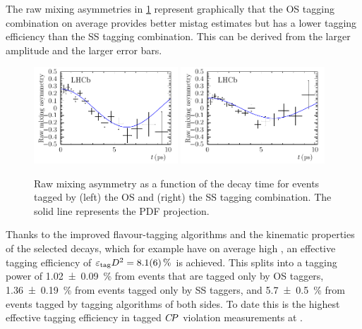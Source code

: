 The raw mixing asymmetries in
\cref{fig:dataanalysis:taggingcalibration:dsdcalibration:rawasymmetries}
represent graphically that the OS tagging combination on average provides
better mistag estimates but has a lower tagging efficiency than the SS tagging
combination. This can be derived from the larger amplitude and the larger
error bars.

\begin{figure}[htb]
\centering
\includegraphics[width=0.48\textwidth]{05-DataAnalysis/tikz/pdf/DsD_MixingAsym_OSComb.pdf}
\includegraphics[width=0.48\textwidth]{05-DataAnalysis/tikz/pdf/DsD_MixingAsym_SSComb.pdf}
\caption{Raw mixing asymmetry as a function of the \Bd decay time for events
tagged by (left) the OS and (right) the SS tagging combination. The solid line
represents the PDF projection.}
\label{fig:dataanalysis:taggingcalibration:dsdcalibration:rawasymmetries}
\end{figure}

Thanks to the improved flavour-tagging algorithms and the kinematic properties
of the selected \BdToDD decays, which for example have on average high \pT, an
effective tagging efficiency of $\etag D^2= \SI{8.1\pm0.6}{\percent}$ is
achieved. This splits into a tagging power of \SI{1.02\pm0.09}{\percent} from
events that are tagged only by OS taggers, \SI{1.36\pm0.19}{\percent} from
events tagged only by SS taggers, and \SI{5.7\pm0.5}{\percent} from events
tagged by tagging algorithms of both sides. To date this is the highest
effective tagging efficiency in tagged $\CP$ violation measurements at \lhcb.